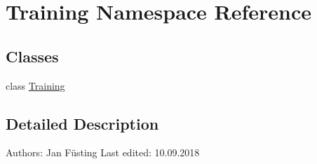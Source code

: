 \hypertarget{namespace_training}{}\section{Training Namespace Reference}
\label{namespace_training}
\subsection*{Classes}
\begin{DoxyCompactItemize}
\item 
class \mbox{\hyperlink{class_training_1_1_training}{Training}}
\end{DoxyCompactItemize}


\subsection{Detailed Description}
\begin{DoxyVerb}Authors:        Jan Füsting
Last edited:    10.09.2018
\end{DoxyVerb}
 